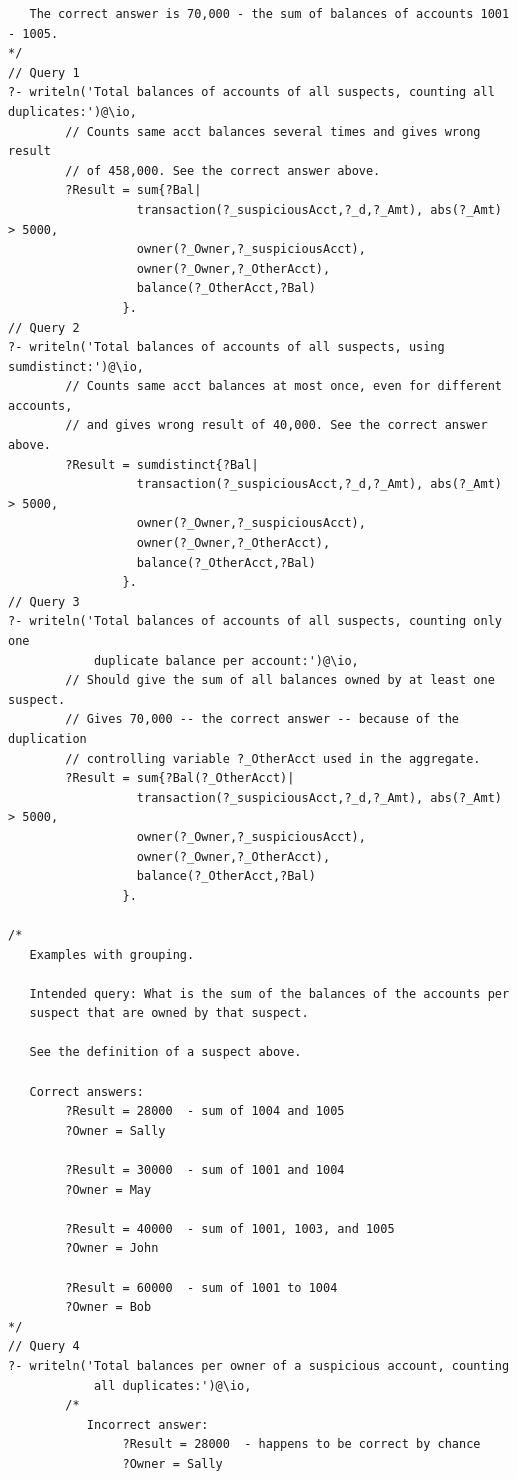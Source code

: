 \documentclass[11pt]{article}
\begin{document}
\begin{verbatim}
   The correct answer is 70,000 - the sum of balances of accounts 1001 - 1005.
*/
// Query 1
?- writeln('Total balances of accounts of all suspects, counting all duplicates:')@\io,
        // Counts same acct balances several times and gives wrong result
        // of 458,000. See the correct answer above.
        ?Result = sum{?Bal|
                  transaction(?_suspiciousAcct,?_d,?_Amt), abs(?_Amt) > 5000,
                  owner(?_Owner,?_suspiciousAcct),
                  owner(?_Owner,?_OtherAcct),
                  balance(?_OtherAcct,?Bal)
                }.
// Query 2
?- writeln('Total balances of accounts of all suspects, using sumdistinct:')@\io,
        // Counts same acct balances at most once, even for different accounts,
        // and gives wrong result of 40,000. See the correct answer above.
        ?Result = sumdistinct{?Bal|
                  transaction(?_suspiciousAcct,?_d,?_Amt), abs(?_Amt) > 5000,
                  owner(?_Owner,?_suspiciousAcct),
                  owner(?_Owner,?_OtherAcct),
                  balance(?_OtherAcct,?Bal)
                }.
// Query 3
?- writeln('Total balances of accounts of all suspects, counting only one
            duplicate balance per account:')@\io,
        // Should give the sum of all balances owned by at least one suspect.
        // Gives 70,000 -- the correct answer -- because of the duplication
        // controlling variable ?_OtherAcct used in the aggregate.
        ?Result = sum{?Bal(?_OtherAcct)|
                  transaction(?_suspiciousAcct,?_d,?_Amt), abs(?_Amt) > 5000,
                  owner(?_Owner,?_suspiciousAcct),
                  owner(?_Owner,?_OtherAcct),
                  balance(?_OtherAcct,?Bal)
                }.

/*
   Examples with grouping.

   Intended query: What is the sum of the balances of the accounts per
   suspect that are owned by that suspect.

   See the definition of a suspect above.

   Correct answers:
        ?Result = 28000  - sum of 1004 and 1005
        ?Owner = Sally

        ?Result = 30000  - sum of 1001 and 1004
        ?Owner = May

        ?Result = 40000  - sum of 1001, 1003, and 1005
        ?Owner = John

        ?Result = 60000  - sum of 1001 to 1004
        ?Owner = Bob
*/
// Query 4
?- writeln('Total balances per owner of a suspicious account, counting
            all duplicates:')@\io,
        /*
           Incorrect answer:
                ?Result = 28000  - happens to be correct by chance
                ?Owner = Sally


\end{verbatim}
\end{document}
